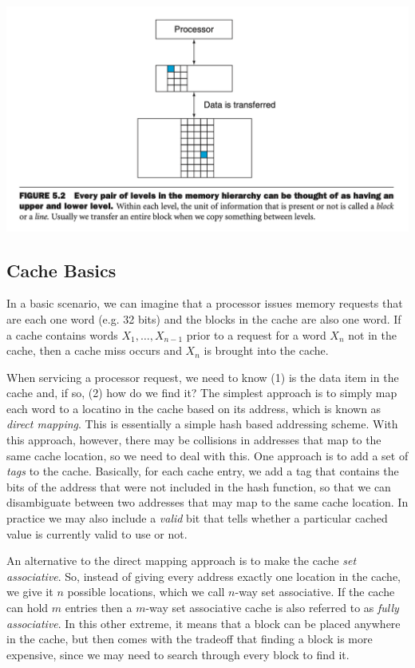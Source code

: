 \documentclass[10pt,a4paper]{article}
\begin{document}
\begin{center}
    \includegraphics[scale=0.35]{images/mem_2levels.png}
\end{center}

\subsection{Cache Basics}

In a basic scenario, we can imagine that a processor issues memory requests that are each one word (e.g. 32 bits) and the blocks in the cache are also one word. If a cache contains words $X_1,\dots,X_{n-1}$ prior to a request for a word $X_n$ not in the cache, then a cache miss occurs and $X_n$ is brought into the cache.

When servicing a processor request, we need to know (1) is the data item in the cache and, if so, (2) how do we find it? The simplest approach is to simply map each word to a locatino in the cache based on its address, which is known as \textit{direct mapping}. This is essentially a simple hash based addressing scheme. With this approach, however, there may be collisions in addresses that map to the same cache location, so we need to deal with this. One approach is to add a set of \textit{tags} to the cache. Basically, for each cache entry, we add a tag that contains the bits of the address that were not included in the hash function, so that we can disambiguate between two addresses that may map to the same cache location. In practice we may also include a \textit{valid} bit that tells whether a particular cached value is currently valid to use or not.

An alternative to the direct mapping approach is to make the cache \textit{set associative}. So, instead of giving every address exactly one location in the cache, we give it $n$ possible locations, which we call $n$-way set associative. If the cache can hold $m$ entries then a $m$-way set associative cache is also referred to as \textit{fully associative}. In this other extreme, it means that a block can be placed anywhere in the cache, but then comes with the tradeoff that finding a block is more expensive, since we may need to search through every block to find it.
\end{document}
